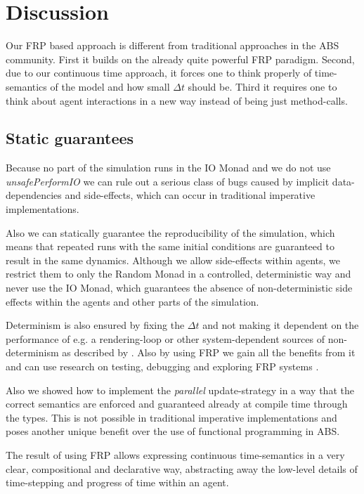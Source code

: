 \section{Discussion}
Our FRP based approach is different from traditional approaches in the ABS community. First it builds on the already quite powerful FRP paradigm. Second, due to our continuous time approach, it forces one to think properly of time-semantics of the model and how small $\Delta t$ should be. Third it requires one to think about agent interactions in a new way instead of being just method-calls.

\subsection{Static guarantees}
Because no part of the simulation runs in the IO Monad and we do not use \textit{unsafePerformIO} we can rule out a serious class of bugs caused by implicit data-dependencies and side-effects, which can occur in traditional imperative implementations.

Also we can statically guarantee the reproducibility of the simulation, which means that repeated runs with the same initial conditions are guaranteed to result in the same dynamics. Although we allow side-effects within agents, we restrict them to only the Random Monad in a controlled, deterministic way and never use the IO Monad, which guarantees the absence of non-deterministic side effects within the agents and other parts of the simulation.

Determinism is also ensured by fixing the $\Delta t$ and not making it dependent on the performance of e.g. a rendering-loop or other system-dependent sources of non-determinism as described by \cite{perez_testing_2017}. Also by using FRP we gain all the benefits from it and can use research on testing, debugging and exploring FRP systems \cite{perez_testing_2017, perez_back_2017}.

Also we showed how to implement the \textit{parallel} update-strategy \cite{thaler_art_2017} in a way that the correct semantics are enforced and guaranteed already at compile time through the types. This is not possible in traditional imperative implementations and poses another unique benefit over the use of functional programming in ABS.

The result of using FRP allows expressing continuous time-semantics in a very clear, compositional and declarative way, abstracting away the low-level details of time-stepping and progress of time within an agent.
	
